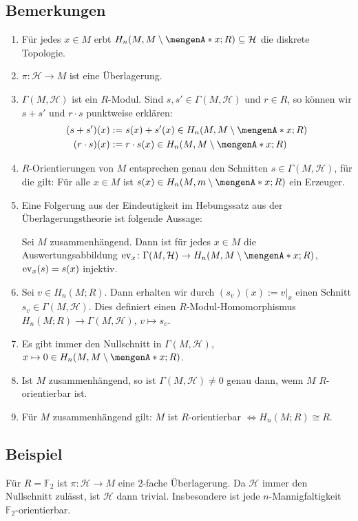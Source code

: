 \subsection[Bemerkung: Eigenschaften von $\mathcal{H}$ und $\mathcal{H} \xrightarrow{\pi} M$]{Bemerkungen} %
\label{sub:1611}
\begin{enumerate}[1)]
	\item Für jedes $x \in M$ erbt $H_n(M,M \setminus \set{x};R) \subseteq \mathcal{H}$ die diskrete Topologie.
	\item $\pi \colon \mathcal{H} \to M$ ist eine Überlagerung.
	\item $\Gamma(M,\mathcal{H})$ ist ein $R$-Modul. Sind $s,s' \in \Gamma(M,\mathcal{H})$ und $r \in R$, so können wir $s+s'$ und $r \cdot s$ punktweise erklären:
	\begin{align*}
		(s+s') (x) &:= s(x) + s'(x) \in H_n(M,M \setminus \set{x};R )\\
		(r \cdot s) (x) &:= r \cdot s(x) \in H_n(M,M \setminus \set{x};R )
	\end{align*}
	\item $R$-Orientierungen von $M$ entsprechen genau den Schnitten $s \in \Gamma(M,\mathcal{H})$, für die gilt: Für alle $x \in M$ ist 
	$s(x) \in H_n(M,m \setminus \set{x};R)$ ein Erzeuger.
	\item Eine Folgerung aus der Eindeutigkeit im Hebungssatz aus der Überlagerungstheorie ist folgende Aussage:
	
	Sei $M$ zusammenhängend. Dann ist für jedes $x \in M$ die Auswertungsabbildung $\ev_x\colon \Gamma(M,\mathcal{H}) \to H_n(M,M \setminus \set{x};R)$, $\operatorname{ev}_x(s)=s(x)$
	injektiv.
	\item Sei $v \in H_n(M;R)$. Dann erhalten wir durch $(s_v)(x) := v|_x$ einen Schnitt $s_v\in \Gamma(M,\mathcal{H})$. Dies definiert einen $R$-Modul-Homomorphismus
	$H_n(M;R) \to \Gamma(M,\mathcal{H})$, $v \mapsto s_v$.
	\item Es gibt immer den Nullschnitt in $\Gamma(M,\mathcal{H})$, $x \mapsto 0\in H_n(M,M\setminus \set{x};R)$.
	\item Ist $M$ zusammenhängend, so ist $\Gamma(M,\mathcal{H})\not=0$ genau dann, wenn $M$ $R$-orientierbar ist.
	\item Für $M$ zusammenhängend gilt: $M$ ist $R$-orientierbar $\iff H_n(M;R) \cong R$. 
\end{enumerate}

\subsection[Beispiel: Für $R=\mathds{F}_2$ ist $\pi\colon \mathcal{H} \to M$ eine $2$-fache Überlagerung]{Beispiel} %
\label{sub:1613}
Für $R=\mathds{F}_2$ ist $\pi\colon \mathcal{H} \to M$ eine $2$-fache Überlagerung. Da $\mathcal{H}$ immer den Nullschnitt zulässt, ist $\mathcal{H}$ dann trivial. 
Insbesondere ist jede $n$-Mannigfaltigkeit $\mathds{F}_2$-orientierbar.

